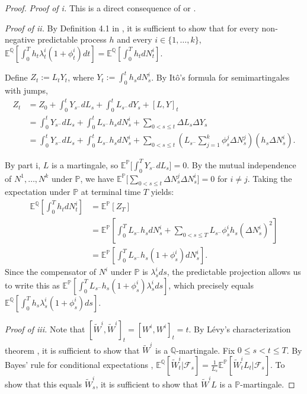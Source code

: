 \documentclass[12pt]{article}
\begin{document}
\begin{proof}
\textit{Proof of i.} This is a direct consequence of \cite[Proposition 2.10]{bjork2021point} or \cite[Theorem 1.36]{oksendal2019stochastic}.

\textit{Proof of ii.} By Definition 4.1 in \cite{bjork2021point}, it is sufficient to show that for every non-negative predictable process $h$ and every $i \in \{1, \dots, k\}$, $\mathbb{E}^\mathbb{Q}\left[ \int_0^T h_t\lambda_t^i(1+\phi^i_t) dt \right] = \mathbb{E}^\mathbb{Q}\left[ \int_0^T h_t dN^i_t \right]$.

Define $Z_t := L_t Y_t$, where $Y_t := \int_0^t h_s dN^i_s$. By Itô's formula for semimartingales with jumps, 
\begin{align*}
    Z_t &= Z_0 + \int_0^t Y_{s^-} dL_s + \int_0^t L_{s^-} dY_s + [L, Y]_t \\
    &= \int_0^t Y_{s^-} dL_s + \int_0^t L_{s^-} h_s dN^i_s + \sum_{0<s\leq t} \Delta L_s \Delta Y_s \\
    &= \int_0^t Y_{s^-} dL_s + \int_0^t L_{s^-} h_s dN^i_s + \sum_{0<s\leq t} \left(L_{s^-} \sum_{j=1}^k \phi_s^j \Delta N_s^j\right) (h_s \Delta N^i_s).
\end{align*}

By part i, $L$ is a martingale, so $\mathbb{E}^\mathbb{P} \big[\int_0^T Y_{s^-} dL_s\big] = 0$. By the mutual independence of $N^1, \dots, N^k$ under $\mathbb{P}$, we have $\mathbb{E}^\mathbb{P} \big[\sum_{0<s\leq t} \Delta N_s^j \Delta N^i_s\big] = 0$ for $i \ne j$.
Taking the expectation under $\mathbb{P}$ at terminal time $T$ yields:
\begin{align*}
    \mathbb{E}^\mathbb{Q} \left[ \int_0^T h_t dN^i_t \right] &= \mathbb{E}^\mathbb{P} [Z_T] \\
    &= \mathbb{E}^\mathbb{P} \left[ \int_0^T L_{s^-} h_s dN^i_s + \sum_{0<s\leq T} L_{s^-}\phi_s^i h_s (\Delta N_s^i)^2 \right] \\
    &= \mathbb{E}^\mathbb{P} \left[ \int_0^T L_{s^-} h_s (1 +\phi_s^i) dN^i_s \right].
\end{align*}
Since the compensator of $N^i$ under $\mathbb{P}$ is $\lambda^i_s ds$, the predictable projection allows us to write this as $\mathbb{E}^\mathbb{P} \left[ \int_0^T L_{s^-} h_s (1 +\phi_s^i)\lambda^i_s ds \right]$, which precisely equals $\mathbb{E}^\mathbb{Q} \left[ \int_0^T h_s\lambda_s^i(1+\phi^i_s) ds \right]$.

\textit{Proof of iii.} Note that $[\tilde{W}^i,\tilde{W}^i]_t = [W^i,W^i]_t = t$. By Lévy's characterization theorem \cite[Theorem 4.6.4]{shreve2004stochastic}, it is sufficient to show that $\tilde{W}^i$ is a $\mathbb{Q}$-martingale. 
Fix $0 \leq s < t \leq T$. By Bayes' rule for conditional expectations \cite[Lemma 5.2.2]{shreve2004stochastic}, $\mathbb{E}^\mathbb{Q}[\tilde{W}^i_t|\mathcal{F}_s] = \frac{1}{L_s}\mathbb{E}^\mathbb{P}[\tilde{W}^i_t L_t|\mathcal{F}_s]$. To show that this equals $\tilde{W}^i_s$, it is sufficient to show that $\tilde{W}^i L$ is a $\mathbb{P}$-martingale.


\end{proof}
\end{document}
